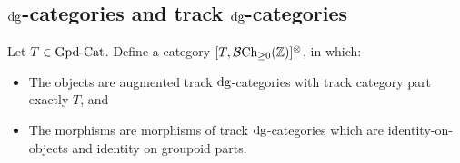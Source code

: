 \documentclass[12pt]{amsart}
\begin{document}
\subsection{$\mathrm{dg}$-categories and track $\mathrm{dg}$-categories}
\newcommand{\bchbasic}{\mathcal{B}\chbasic}

\begin{definition}
	Let $T \in \mathrm{Gpd}\text{-}\mathrm{Cat}$. 
	Define a category $[T, \bchbasic]^\otimes$, in which:
	\begin{itemize}
		\item The objects are augmented track $\mathrm{dg}$-categories with track category part exactly $T$, and 
		\item The morphisms are morphisms of track $\mathrm{dg}$-categories which are identity-on-objects and identity on groupoid parts.
	\end{itemize}
\end{definition}
\end{document}
